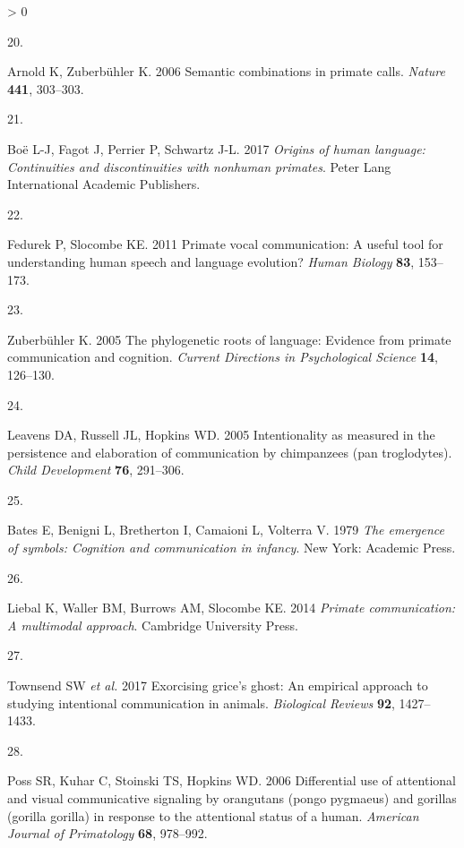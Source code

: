 \documentclass[
  english,
  man,floatsintext]{apa6}
\newlength{\cslhangindent}
\newlength{\csllabelwidth}
\newenvironment{CSLReferences}[2] %
 {%
  \setlength{\parindent}{0pt}
  \ifodd #1 \everypar{\setlength{\hangindent}{\cslhangindent}}\ignorespaces\fi
  \ifnum #2 > 0
  \setlength{\parskip}{#2\baselineskip}
  \fi
 }%
 {}
\newcommand{\CSLLeftMargin}[1]{\parbox[t]{\csllabelwidth}{#1}}
\newcommand{\CSLRightInline}[1]{\parbox[t]{\linewidth - \csllabelwidth}{#1}\break}
\begin{document}
\begin{CSLReferences}{0}{0}
\leavevmode\hypertarget{ref-arnold2006semantic}{}%
\CSLLeftMargin{20. }
\CSLRightInline{Arnold K, Zuberbühler K. 2006 Semantic combinations in primate calls. \emph{Nature} \textbf{441}, 303--303.}

\leavevmode\hypertarget{ref-boe2017origins}{}%
\CSLLeftMargin{21. }
\CSLRightInline{Boë L-J, Fagot J, Perrier P, Schwartz J-L. 2017 \emph{Origins of human language: Continuities and discontinuities with nonhuman primates}. Peter Lang International Academic Publishers. }

\leavevmode\hypertarget{ref-fedurek2011primate}{}%
\CSLLeftMargin{22. }
\CSLRightInline{Fedurek P, Slocombe KE. 2011 Primate vocal communication: A useful tool for understanding human speech and language evolution? \emph{Human Biology} \textbf{83}, 153--173.}

\leavevmode\hypertarget{ref-zuberbuhler2005phylogenetic}{}%
\CSLLeftMargin{23. }
\CSLRightInline{Zuberbühler K. 2005 The phylogenetic roots of language: Evidence from primate communication and cognition. \emph{Current Directions in Psychological Science} \textbf{14}, 126--130.}

\leavevmode\hypertarget{ref-leavens2005intentionality}{}%
\CSLLeftMargin{24. }
\CSLRightInline{Leavens DA, Russell JL, Hopkins WD. 2005 Intentionality as measured in the persistence and elaboration of communication by chimpanzees (pan troglodytes). \emph{Child Development} \textbf{76}, 291--306.}

\leavevmode\hypertarget{ref-bates1979emergence}{}%
\CSLLeftMargin{25. }
\CSLRightInline{Bates E, Benigni L, Bretherton I, Camaioni L, Volterra V. 1979 \emph{The emergence of symbols: Cognition and communication in infancy}. New York: Academic Press. }

\leavevmode\hypertarget{ref-liebal2014primate}{}%
\CSLLeftMargin{26. }
\CSLRightInline{Liebal K, Waller BM, Burrows AM, Slocombe KE. 2014 \emph{Primate communication: A multimodal approach}. Cambridge University Press. }

\leavevmode\hypertarget{ref-townsend2017exorcising}{}%
\CSLLeftMargin{27. }
\CSLRightInline{Townsend SW \emph{et al.} 2017 Exorcising grice's ghost: An empirical approach to studying intentional communication in animals. \emph{Biological Reviews} \textbf{92}, 1427--1433.}

\leavevmode\hypertarget{ref-poss2006differential}{}%
\CSLLeftMargin{28. }
\CSLRightInline{Poss SR, Kuhar C, Stoinski TS, Hopkins WD. 2006 Differential use of attentional and visual communicative signaling by orangutans (pongo pygmaeus) and gorillas (gorilla gorilla) in response to the attentional status of a human. \emph{American Journal of Primatology} \textbf{68}, 978--992.}


\end{CSLReferences}
\end{document}
